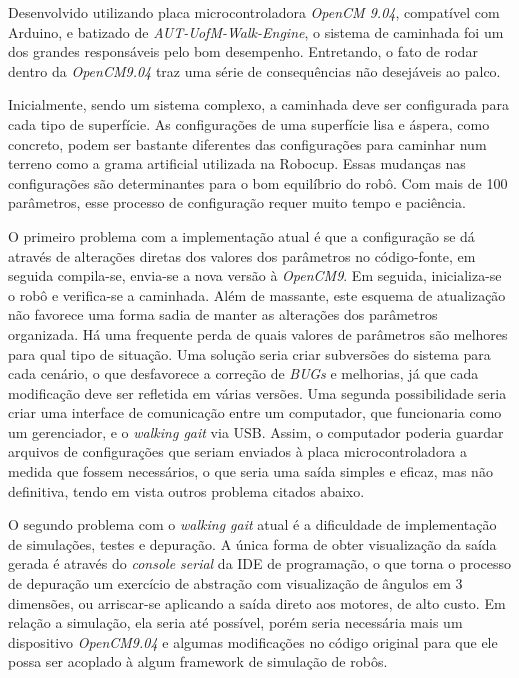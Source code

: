 Desenvolvido utilizando placa microcontroladora \textit{OpenCM 9.04}, compatível com Arduino, e batizado de \textit{AUT-UofM-Walk-Engine}, o sistema de caminhada foi um dos grandes responsáveis pelo bom desempenho. Entretando, o fato de rodar dentro da \textit{OpenCM9.04} traz uma série de consequências não desejáveis ao palco.

Inicialmente, sendo um sistema complexo, a caminhada deve ser configurada para cada tipo de superfície. As configurações de uma superfície lisa e áspera, como concreto, podem ser bastante diferentes das configurações para caminhar num terreno como a grama artificial utilizada na Robocup. Essas mudanças nas configurações são determinantes para o bom equilíbrio do robô. Com mais de 100 parâmetros, esse processo de configuração requer muito tempo e paciência.

O primeiro problema com a implementação atual é que a configuração se dá através de alterações diretas dos valores dos parâmetros no código-fonte, em seguida compila-se, envia-se a nova versão à \textit{OpenCM9}. Em seguida, inicializa-se o robô e verifica-se a caminhada. Além de massante, este esquema de atualização não favorece uma forma sadia de manter as alterações dos parâmetros organizada. Há uma frequente perda de quais valores de parâmetros são melhores para qual tipo de situação. Uma solução seria criar subversões do sistema para cada cenário, o que desfavorece a correção de \textit{BUGs} e melhorias, já que cada modificação deve ser refletida em várias versões. Uma segunda possibilidade seria criar uma interface de comunicação entre um computador, que funcionaria como um gerenciador, e o  \textit{walking gait} via USB. Assim, o computador poderia guardar arquivos de configurações que seriam enviados à placa microcontroladora a medida que fossem necessários, o que seria uma saída simples e eficaz, mas não definitiva, tendo em vista outros problema citados abaixo.

O segundo problema com o \textit{walking gait} atual é a dificuldade de implementação de simulações, testes e depuração. A única forma de obter visualização da saída gerada é através do \textit{console serial} da IDE de programação, o que torna o processo de depuração um exercício de abstração com visualização de ângulos em 3 dimensões, ou arriscar-se aplicando a saída direto aos motores, de alto custo. Em relação a simulação, ela seria até possível, porém seria necessária mais um dispositivo \textit{OpenCM9.04} e algumas modificações no código original para que ele possa ser acoplado à algum framework de simulação de robôs.

